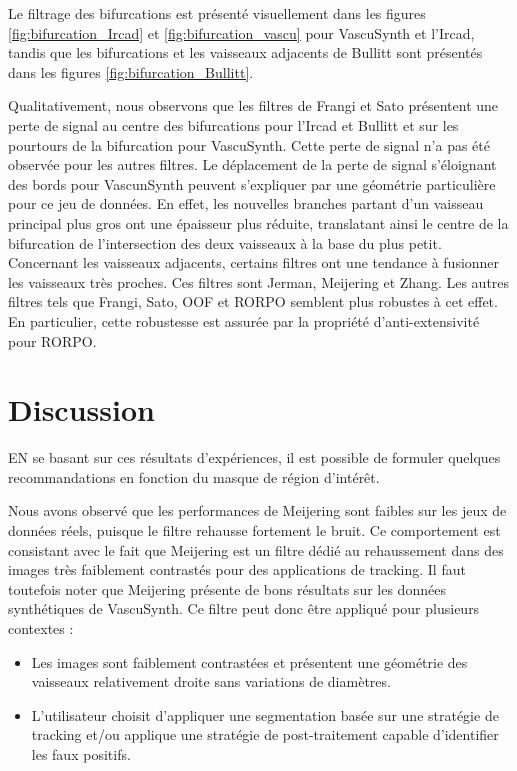 Le filtrage des bifurcations est présenté visuellement dans les figures \ref{fig:bifurcation_Ircad} et \ref{fig:bifurcation_vascu} pour VascuSynth et l'Ircad, tandis que les bifurcations et les vaisseaux adjacents de Bullitt sont présentés dans les figures \ref{fig:bifurcation_Bullitt}.

Qualitativement, nous observons que les filtres de Frangi et Sato présentent une perte de signal au centre des bifurcations pour l'Ircad et Bullitt et sur les pourtours de la bifurcation pour VascuSynth. Cette perte de signal n'a pas été observée pour les autres filtres. Le déplacement de la perte de signal s'éloignant des bords pour VascunSynth peuvent s'expliquer par une géométrie particulière pour ce jeu de données. En effet, les nouvelles branches partant d'un vaisseau principal plus gros ont une épaisseur plus réduite, translatant ainsi le centre de la bifurcation de l'intersection des deux vaisseaux à la base du plus petit. Concernant les vaisseaux adjacents, certains filtres ont une tendance à fusionner les vaisseaux très proches. Ces filtres sont Jerman, Meijering et Zhang. Les autres filtres tels que Frangi, Sato, OOF et RORPO semblent plus robustes à cet effet. En particulier, cette robustesse est assurée par la propriété d'anti-extensivité pour RORPO.

\section{Discussion}

EN se basant sur ces résultats d'expériences, il est possible de formuler quelques recommandations en fonction du masque de région d'intérêt.

Nous avons observé que les performances de Meijering sont faibles sur les jeux de données réels, puisque le filtre rehausse fortement le bruit. Ce comportement est consistant avec le fait que Meijering est un filtre dédié au rehaussement dans des images très faiblement contrastés pour des applications de tracking. Il faut toutefois noter que Meijering présente de bons résultats sur les données synthétiques de VascuSynth. Ce filtre peut donc être appliqué pour plusieurs contextes :

\begin{itemize}
  \item Les images sont faiblement contrastées et présentent une géométrie des vaisseaux relativement droite sans variations de diamètres.
  \item L'utilisateur choisit d'appliquer une segmentation basée sur une stratégie de tracking et/ou applique une stratégie de post-traitement capable d'identifier les faux positifs.
\end{itemize}

